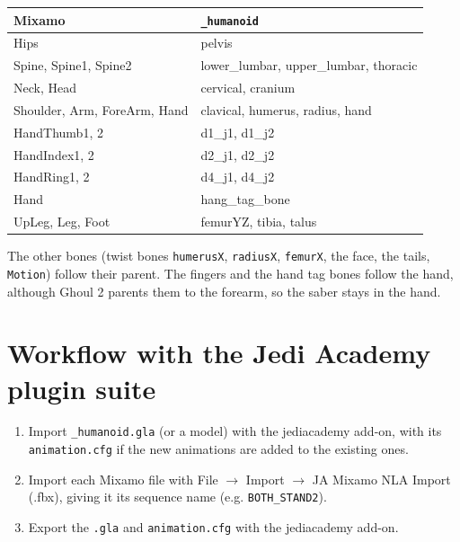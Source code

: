 \documentclass[a4paper,10pt]{article}
\begin{document}
 \begin{tabular}{ll}
  Mixamo & \texttt{\_humanoid} \\
  \hline
  Hips & pelvis \\
  Spine, Spine1, Spine2 & lower\_lumbar, upper\_lumbar, thoracic \\
  Neck, Head & cervical, cranium \\
  Shoulder, Arm, ForeArm, Hand & clavical, humerus, radius, hand \\
  HandThumb1, 2 & d1\_j1, d1\_j2 \\
  HandIndex1, 2 & d2\_j1, d2\_j2 \\
  HandRing1, 2 & d4\_j1, d4\_j2 \\
  Hand & hang\_tag\_bone \\
  UpLeg, Leg, Foot & femurYZ, tibia, talus \\
 \end{tabular}

 \medskip

 The other bones (twist bones \texttt{humerusX}, \texttt{radiusX}, \texttt{femurX}, the face, the
 tails, \texttt{Motion}) follow their parent. The fingers and the hand tag bones follow the hand,
 although Ghoul 2 parents them to the forearm, so the saber stays in the hand.

 \section{Workflow with the Jedi Academy plugin suite}

 \begin{enumerate}
  \item Import \texttt{\_humanoid.gla} (or a model) with the jediacademy add-on, with its
        \texttt{animation.cfg} if the new animations are added to the existing ones.
  \item Import each Mixamo file with File $\rightarrow$ Import $\rightarrow$ JA Mixamo NLA Import
        (.fbx), giving it its sequence name (e.g. \texttt{BOTH\_STAND2}).
  \item Export the \texttt{.gla} and \texttt{animation.cfg} with the jediacademy add-on.
 \end{enumerate}
\end{document}
